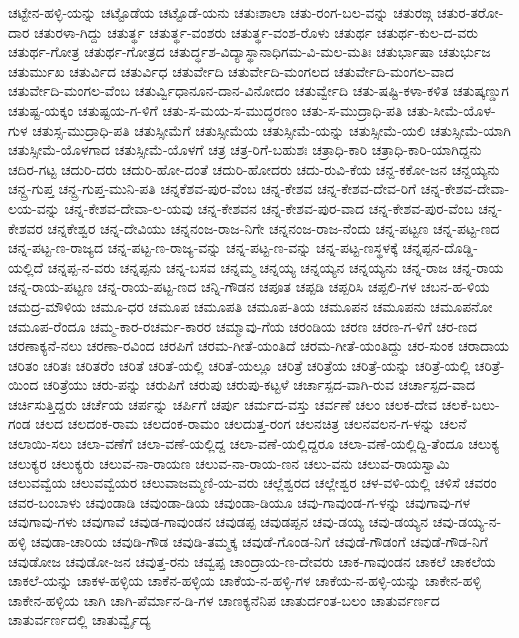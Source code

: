 ಚಟ್ಟೇನ-ಹಳ್ಳಿ-ಯನ್ನು
ಚಟ್ಟೊಡೆಯ
ಚಟ್ಟೊಡೆ-ಯನು
ಚತುಃಶಾಲಾ
ಚತು-ರಂಗ-ಬಲ-ವನ್ನು
ಚತುರಙ್ಗ
ಚತುರ-ತರೋ-ದಾರ
ಚತುರಳಾ-ಗಿದ್ದು
ಚತುರ್ತ್ಥ
ಚತುರ್ತ್ಥ-ವಂಶರು
ಚತುರ್ತ್ಥ-ವಂಶ-ರೊಳು
ಚತುರ್ಥ
ಚತುರ್ಥ-ಕುಲ-ದ-ವರು
ಚತುರ್ಥ-ಗೋತ್ರ
ಚತುರ್ಥ-ಗೋತ್ರದ
ಚತುರ್ದ್ಧಶ-ವಿದ್ಯಾಸ್ಥಾನಾಧಿಗಮ-ವಿ-ಮಲ-ಮತಿಃ
ಚತುರ್ಭಾಷಾ
ಚತುರ್ಭುಜ
ಚತುರ್ಮುಖ
ಚತುರ್ವಿದ
ಚತುರ್ವಿಧ
ಚತುರ್ವೇದಿ
ಚತುರ್ವೇದಿ-ಮಂಗಲದ
ಚತುರ್ವೇದಿ-ಮಂಗಲ-ವಾದ
ಚತುರ್ವೇದಿ-ಮಂಗಲ-ವೆಂಬ
ಚತುರ್ವ್ವಿಧಾನೂನ-ದಾನ-ವಿನೋದಂ
ಚತುರ್ವ್ವೇದಿ
ಚತು-ಷಷ್ಟಿ-ಕಳಾ-ಕಳಿತ
ಚತುಷ್ಕಣ್ಡುಗ
ಚತುಷ್ಟ-ಯಕ್ಕಂ
ಚತುಷ್ಟಯ-ಗ-ಳಿಗೆ
ಚತು-ಸ-ಮಯ-ಸ-ಮುದ್ಧರಣಂ
ಚತು-ಸ-ಮುದ್ರಾಧಿ-ಪತಿ
ಚತು-ಸೀಮೆ-ಯೊಳ-ಗುಳ
ಚತುಸ್ಸ-ಮುದ್ರಾಧಿ-ಪತಿ
ಚತುಸ್ಸೀಮೆಗೆ
ಚತುಸ್ಸೀಮೆಯ
ಚತುಸ್ಸೀಮೆ-ಯನ್ನು
ಚತುಸ್ಸೀಮೆ-ಯಲಿ
ಚತುಸ್ಸೀಮೆ-ಯಾಗಿ
ಚತುಸ್ಸೀಮೆ-ಯೊಳಗಾದ
ಚತುಸ್ಸೀಮೆ-ಯೊಳಗೆ
ಚತ್ರ
ಚತ್ರ-ರಿಗೆ-ಬಹುಶಃ
ಚತ್ರಾಧಿ-ಕಾರಿ
ಚತ್ರಾಧಿ-ಕಾರಿ-ಯಾಗಿದ್ದನು
ಚದಿರ-ಗಟ್ಟ
ಚದುರಿ-ದರು
ಚದುರಿ-ಹೋ-ದಂತೆ
ಚದುರಿ-ಹೋದರು
ಚದು-ರುವಿ-ಕೆಯ
ಚನ್ದ-ಕಕೋ-ಜನ
ಚನ್ದಯ್ಯನು
ಚನ್ದ್ರ-ಗುಪ್ತ
ಚನ್ದ್ರ-ಗುಪ್ತ-ಮುನಿ-ಪತಿ
ಚನ್ನಕೆಶವ-ಪುರ-ವೆಂಬ
ಚನ್ನ-ಕೇಶವ
ಚನ್ನ-ಕೇಶವ-ದೇವ-ರಿಗೆ
ಚನ್ನ-ಕೇಶವ-ದೇವಾ-ಲಯ-ವನ್ನು
ಚನ್ನ-ಕೇಶವ-ದೇವಾ-ಲ-ಯವು
ಚನ್ನ-ಕೇಶವನ
ಚನ್ನ-ಕೇಶವ-ಪುರ-ವಾದ
ಚನ್ನ-ಕೇಶವ-ಪುರ-ವೆಂಬ
ಚನ್ನ-ಕೇಶವರ
ಚನ್ನಕೇಶ್ವರ
ಚನ್ನ-ದೇವಿಯು
ಚನ್ನನಂಜ-ರಾಜ-ನಿಗೇ
ಚನ್ನನಂಜ-ರಾಜ-ನೆಂದು
ಚನ್ನ-ಪಟ್ಟಣ
ಚನ್ನ-ಪಟ್ಟ-ಣದ
ಚನ್ನ-ಪಟ್ಟ-ಣ-ರಾಜ್ಯದ
ಚನ್ನ-ಪಟ್ಟ-ಣ-ರಾಜ್ಯ-ವನ್ನು
ಚನ್ನ-ಪಟ್ಟ-ಣ-ವನ್ನು
ಚನ್ನ-ಪಟ್ಟ-ಣಸ್ಥಳಕ್ಕೆ
ಚನ್ನಪ್ಪನ-ದೊಡ್ಡಿ-ಯಲ್ಲಿದೆ
ಚನ್ನಪ್ಪ-ನ-ವರು
ಚನ್ನಪ್ಪನು
ಚನ್ನ-ಬಸವ
ಚನ್ನಮ್ಮ
ಚನ್ನಯ್ಯ
ಚನ್ನಯ್ಯನ
ಚನ್ನಯ್ಯನು
ಚನ್ನ-ರಾಜ
ಚನ್ನ-ರಾಯ
ಚನ್ನ-ರಾಯ-ಪಟ್ಟಣ
ಚನ್ನ-ರಾಯ-ಪಟ್ಟ-ಣದ
ಚನ್ನಿ-ಗೌಡನ
ಚಪೂತ
ಚಪ್ಪಡಿ
ಚಪ್ಪರಿಸಿ
ಚಪ್ಪಲಿ-ಗಳ
ಚಬನ-ಹ-ಳಿಯ
ಚಮದ್ರ-ಮೌಳಿಯ
ಚಮೂ-ಧರ
ಚಮೂಪ
ಚಮೂಪತಿ
ಚಮೂಪ-ತಿಯ
ಚಮೂಪನ
ಚಮೂಪನು
ಚಮೂಪನೋ
ಚಮೂಪ-ರೆಂದೂ
ಚಮ್ಮ-ಕಾರ-ರಚರ್ಮ-ಕಾರರ
ಚಮ್ಮಾವು-ಗೆಯ
ಚರಂಡಿಯ
ಚರಣ
ಚರಣ-ಗ-ಳಿಗೆ
ಚರ-ಣದ
ಚರಣಾಕ್ಯನೆ-ನಲು
ಚರಣಾ-ರವಿಂದ
ಚರಪಿಗೆ
ಚರಮ-ಗೀತೆ-ಯಂತಿದೆ
ಚರಮ-ಗೀತೆ-ಯಂತಿದ್ದು
ಚರ-ಸುಂಕ
ಚರಾದಾಯ
ಚರಿತಂ
ಚರಿತಃ
ಚರಿತರೆಂ
ಚರಿತೆ
ಚರಿತೆ-ಯಲ್ಲಿ
ಚರಿತೆ-ಯಲ್ಲೂ
ಚರಿತ್ರೆ
ಚರಿತ್ರೆಯ
ಚರಿತ್ರೆ-ಯನ್ನು
ಚರಿತ್ರೆ-ಯಲ್ಲಿ
ಚರಿತ್ರೆ-ಯಿಂದ
ಚರಿತ್ರೆಯು
ಚರು-ಪನ್ನು
ಚರುಪಿಗೆ
ಚರುಪು
ಚರುಪು-ಕಟ್ಟಳೆ
ಚರ್ಚಾಸ್ಪದ-ವಾಗಿ-ರುವ
ಚರ್ಚಾಸ್ಪದ-ವಾದ
ಚರ್ಚಿಸುತ್ತಿದ್ದರು
ಚರ್ಚೆಯ
ಚರ್ಪನ್ನು
ಚರ್ಪಿಗೆ
ಚರ್ಪು
ಚರ್ಮದ-ವಸ್ತು
ಚರ್ವಣೆ
ಚಲಂ
ಚಲಕ-ದೇವ
ಚಲಕೆ-ಬಲು-ಗಂಡ
ಚಲದ
ಚಲದಂಕ-ರಾಮ
ಚಲದಂಕ-ರಾಮಂ
ಚಲದುತ್ತ-ರಂಗ
ಚಲನಚಿತ್ರ
ಚಲನವಲನ-ಗ-ಳನ್ನು
ಚಲನೆ
ಚಲಾಯಿ-ಸಲು
ಚಲಾ-ವಣೆಗೆ
ಚಲಾ-ವಣೆ-ಯಲ್ಲಿದ್ದ
ಚಲಾ-ವಣೆ-ಯಲ್ಲಿದ್ದರೂ
ಚಲಾ-ವಣೆ-ಯಲ್ಲಿದ್ದಿ-ತೆಂದೂ
ಚಲುಕ್ಯ
ಚಲುಕ್ಯರ
ಚಲುಕ್ಯರು
ಚಲುವ-ನಾ-ರಾಯಣ
ಚಲುವ-ನಾ-ರಾಯ-ಣನ
ಚಲು-ವನು
ಚಲುವ-ರಾಯಸ್ವಾಮಿ
ಚಲುವವ್ವೆಯ
ಚಲುವವ್ವೆಯರ
ಚಲುವಾಜಮ್ಮಣಿ-ಯ-ವರು
ಚಲ್ಲೆಶ್ವರದ
ಚಲ್ಲೇಶ್ವರ
ಚಳ-ವಳಿ-ಯಲ್ಲಿ
ಚಳಿಸೆ
ಚವರಂ
ಚವರ-ಬಂಬಾಳು
ಚವುಂಡಾಡಿ
ಚವುಂಡಾ-ಡಿಯ
ಚವುಂಡಾ-ಡಿಯೂ
ಚವು-ಗಾವುಂಡ-ಗ-ಳನ್ನು
ಚವುಗಾವು-ಗಳ
ಚವುಗಾವು-ಗಳು
ಚವುಗಾವೆ
ಚವುಡ-ಗಾವುಂಡನ
ಚವುಡಪ್ಪ
ಚವುಡಪ್ಪನ
ಚವು-ಡಯ್ಯ
ಚವು-ಡಯ್ಯನ
ಚವು-ಡಯ್ಯ-ನ-ಹಳ್ಳಿ
ಚವುಡಾ-ಚಾರಿಯ
ಚವುಡಿ-ಗೌಡ
ಚವುಡಿ-ತಮ್ಮಕ್ಕ
ಚವುಡೆ-ಗೊಂಡ-ನಿಗೆ
ಚವುಡೆ-ಗೌಡಂಗೆ
ಚವುಡೆ-ಗೌಡ-ನಿಗೆ
ಚವುಡೋಜ
ಚವುಡೋ-ಜನ
ಚವುತ್ತ-ರನು
ಚವ್ವಪ್ಪ
ಚಾಂದ್ರಾಯ-ಣ-ದೇವರು
ಚಾಕ-ಗಾವುಂಡನ
ಚಾಕಲೆ
ಚಾಕಲೆಯ
ಚಾಕಲೆ-ಯನ್ನು
ಚಾಕಳ-ಹಳ್ಳಿಯ
ಚಾಕೆನ-ಹಳ್ಳಿಯ
ಚಾಕೆಯ-ನ-ಹಳ್ಳಿ-ಗಳ
ಚಾಕೆಯ-ನ-ಹಳ್ಳಿ-ಯನ್ನು
ಚಾಕೇನ-ಹಳ್ಳಿ
ಚಾಕೇನ-ಹಳ್ಳಿಯ
ಚಾಗಿ
ಚಾಗಿ-ಪೆರ್ಮಾನ-ಡಿ-ಗಳ
ಚಾಣಕ್ಯನೆನಿಪ
ಚಾತುರ್ದಂತ-ಬಲಂ
ಚಾತುರ್ವರ್ಣದ
ಚಾತುರ್ವರ್ಣದಲ್ಲಿ
ಚಾತುರ್ವ್ವೈದ್ಯ
